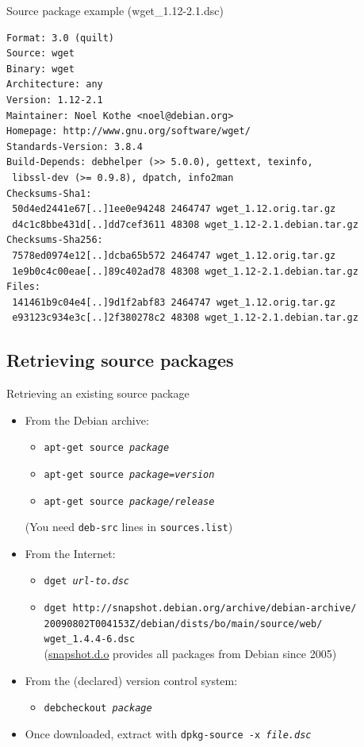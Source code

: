 \documentclass[10pt,final]{beamer}
\begin{document}
\begin{frame}[fragile]{Source package example (wget\_1.12-2.1.dsc)}
  \begin{lstlisting}[basicstyle=\ttfamily\small]
Format: 3.0 (quilt)
Source: wget
Binary: wget
Architecture: any
Version: 1.12-2.1
Maintainer: Noel Kothe <noel@debian.org>
Homepage: http://www.gnu.org/software/wget/
Standards-Version: 3.8.4
Build-Depends: debhelper (>> 5.0.0), gettext, texinfo,
 libssl-dev (>= 0.9.8), dpatch, info2man
Checksums-Sha1: 
 50d4ed2441e67[..]1ee0e94248 2464747 wget_1.12.orig.tar.gz
 d4c1c8bbe431d[..]dd7cef3611 48308 wget_1.12-2.1.debian.tar.gz
Checksums-Sha256: 
 7578ed0974e12[..]dcba65b572 2464747 wget_1.12.orig.tar.gz
 1e9b0c4c00eae[..]89c402ad78 48308 wget_1.12-2.1.debian.tar.gz
Files: 
 141461b9c04e4[..]9d1f2abf83 2464747 wget_1.12.orig.tar.gz
 e93123c934e3c[..]2f380278c2 48308 wget_1.12-2.1.debian.tar.gz
\end{lstlisting}
\end{frame}

\subsection{Retrieving source packages}
\begin{frame}{Retrieving an existing source package}
  \begin{itemize}
  \item From the Debian archive:
    \begin{itemize}
    \item \texttt{apt-get source \textsl{package}}
    \item \texttt{apt-get source \textsl{package=version}}
    \item \texttt{apt-get source \textsl{package/release}}
    \end{itemize}
    (You need \texttt{deb-src} lines in \texttt{sources.list})
    \br
  \item From the Internet:
    \begin{itemize}
    \item \texttt{dget \textsl{url-to.dsc}}
    \item \texttt{dget http://snapshot.debian.org/archive/debian-archive/\\20090802T004153Z/debian/dists/bo/main/source/web/\\
        wget\_1.4.4-6.dsc}\\ 
      (\href{http://snapshot.debian.org/}{\ttfamily snapshot.d.o} provides all packages from Debian since 2005)
    \end{itemize}
    \br
  \item From the (declared) version control system:
    \begin{itemize}
    \item \texttt{debcheckout \textsl{package}}
    \end{itemize}
    \br
  \item Once downloaded, extract with \texttt{dpkg-source -x \textsl{file.dsc}}
  \end{itemize}
\end{frame}
\end{document}
